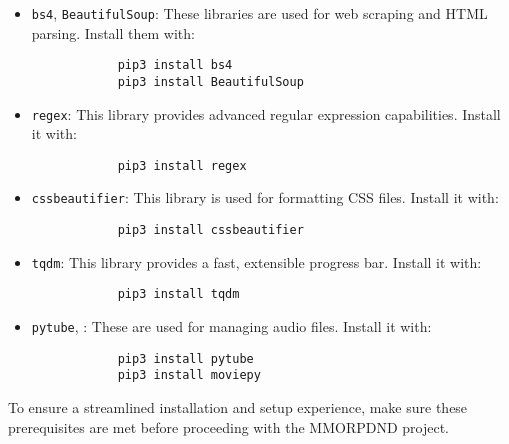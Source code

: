 \begin{itemize}
	\begin{itemize}
		\item \texttt{bs4}, \texttt{BeautifulSoup}: These libraries are used for web scraping and HTML parsing. Install them with:
		
		\begin{verbatim}
			pip3 install bs4
			pip3 install BeautifulSoup
		\end{verbatim}
		
		\item \texttt{regex}: This library provides advanced regular expression capabilities. Install it with:
		
		\begin{verbatim}
			pip3 install regex
		\end{verbatim}
		
		\item \texttt{cssbeautifier}: This library is used for formatting CSS files. Install it with:
		
		\begin{verbatim}
			pip3 install cssbeautifier
		\end{verbatim}
		
		\item \texttt{tqdm}: This library provides a fast, extensible progress bar. Install it with:
		
		\begin{verbatim}
			pip3 install tqdm
		\end{verbatim}

  		\item \texttt{pytube}, : These are used for managing audio files. Install it with:		
    
		\begin{verbatim}
			pip3 install pytube
			pip3 install moviepy
		\end{verbatim}
	\end{itemize}
\end{itemize}

To ensure a streamlined installation and setup experience, make sure these prerequisites are met before proceeding with the MMORPDND project.
